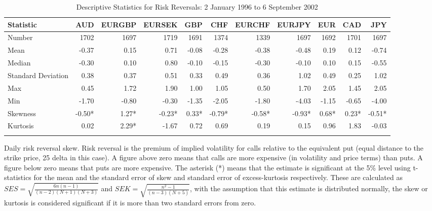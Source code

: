 \documentclass[12pt, a4paper, oneside]{article} %
\begin{document}
\begin{landscape}
\begin{table}[t!]
\begin{threeparttable}
\caption{Descriptive Statistics for Risk Reversals: 2 January 1996 to 6 September 2002}
\begin{tabular}{l | r r  r r r r r r r r}
  \hline
 Statistic &  AUD & EURGBP & EURSEK & GBP & CHF & EURCHF & EURJPY & EUR & CAD & JPY \\
 \hline
Number & 1702 & 1697 & 1719 & 1691 & 1374 & 1339 & 1697 & 1692 & 1701 & 1697 \\ 
  Mean & -0.37 & 0.15 & 0.71 & -0.08 & -0.28 & -0.38 & -0.48 & 0.19 & 0.12 & -0.74 \\ 
  Median & -0.30 & 0.10 & 0.80 & -0.10 & -0.15 & -0.30 & -0.10 & 0.10 & 0.15 & -0.55 \\ 
  Standard Deviation & 0.38 & 0.37 & 0.51 & 0.33 & 0.49 & 0.36 & 1.02 & 0.49 & 0.25 & 1.02 \\ 
 Max & 0.45 & 1.72 & 1.90 & 1.00 & 1.05 & 0.50 & 1.70 & 2.05 & 1.45 & 2.05 \\ 
 Min & -1.70 & -0.80 & -0.30 & -1.35 & -2.05 & -1.80 & -4.03 & -1.15 & -0.65 & -4.00 \\ 
 Skewness & -0.50* & 1.27* & -0.23* & 0.33* & -0.79* & -0.58* & -0.93* & 0.68* & 0.23* & -0.51* \\ 
  Kurtosis & 0.02 & 2.29* & -1.67 & 0.72 & 0.69 & 0.19 & 0.15 & 0.96 & 1.83 & -0.03 \\ 
      \hline
 \label{tabref:DS2}
\end{tabular}
\begin{tablenotes}
\small
\item Daily risk reversal skew.  Risk reversal is the premium of implied volatility for calls relative to the equivalent put (equal distance to the strike price, 25 delta in this case).  A figure above zero means that calls are more expensive (in volatility and price terms) than puts.  A figure below zero means that puts are more expensive. The asterisk (*) means that the estimate is significant at the 5\% level using t-statistics for the mean and the standard error of skew and standard error of excess-kurtosis respectively.   These are calculated as $SES = \sqrt{\frac{6n(n-1)}{(n-2)(N+1)(N+3)}}$ and $SEK = \sqrt{\frac{n^2-1}{(n-3)(N+5)}}$, with the assumption that this estimate is distributed normally, the skew or kurtosis is considered significant if it is more than two standard errors from zero.
\end{tablenotes}
\end{threeparttable}
\end{table}
\end{landscape}
\end{document}
